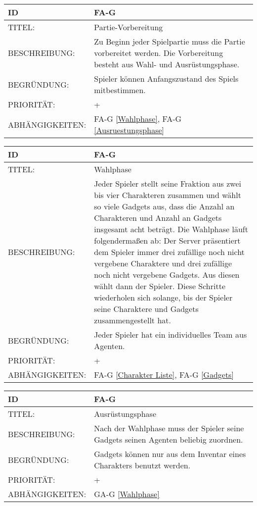 \begin{tabularx}{16cm}{l|X}
	{table}\label{Partie-Vorbereitung}
	\textbf{ID} & \textbf{FA-G \arabic{table}} \\
	\hline
	TITEL: & Partie-Vorbereitung \\
	\hline
	BESCHREIBUNG: & Zu Beginn jeder Spielpartie muss die Partie vorbereitet werden. Die Vorbereitung besteht aus Wahl- und Ausrüstungsphase. \\
	\hline
	BEGRÜNDUNG: & Spieler können Anfangszustand des Spiels mitbestimmen. \\
	\hline
	PRIORITÄT: & +\\
	\hline
	ABHÄNGIGKEITEN: & FA-G \ref{Wahlphase}, FA-G \ref{Ausruestungsphase} \\
\end{tabularx}

\begin{tabularx}{16cm}{l|X}
	{table}\label{Wahlphase}
	\textbf{ID} & \textbf{FA-G \arabic{table}} \\
	\hline
	TITEL: & Wahlphase \\
	\hline
	BESCHREIBUNG: & Jeder Spieler stellt seine Fraktion aus zwei bis vier Charakteren zusammen und wählt so viele Gadgets aus, dass die Anzahl an Charakteren und Anzahl an Gadgets insgesamt acht beträgt.
	\newline Die Wahlphase läuft folgendermaßen ab: Der Server präsentiert dem Spieler immer drei zufällige noch nicht vergebene Charaktere und drei zufällige noch nicht vergebene Gadgets. Aus diesen wählt dann der Spieler.
	\newline Diese Schritte wiederholen sich solange, bis der Spieler seine Charaktere und Gadgets zusammengestellt hat.\\
	\hline
	BEGRÜNDUNG: & Jeder Spieler hat ein individuelles Team aus Agenten. \\
	\hline
	PRIORITÄT: & +\\
	\hline
	ABHÄNGIGKEITEN: &  FA-G \ref{Charakter Liste}, FA-G \ref{Gadgets}\\
\end{tabularx}

\begin{tabularx}{16cm}{l|X}
	{table}\label{Ausruestungsphase}
	\textbf{ID} & \textbf{FA-G \arabic{table}} \\
	\hline
	TITEL: & Ausrüstungsphase \\
	\hline
	BESCHREIBUNG: & Nach der Wahlphase muss der Spieler seine Gadgets seinen Agenten beliebig zuordnen.\\
	\hline
	BEGRÜNDUNG: & Gadgets können nur aus dem Inventar eines Charakters benutzt werden. \\
	\hline
	PRIORITÄT: & +\\
	\hline
	ABHÄNGIGKEITEN: & GA-G \ref{Wahlphase} \\
\end{tabularx}

